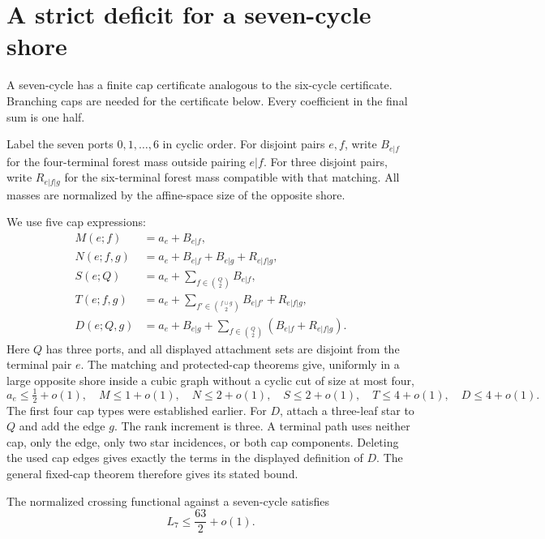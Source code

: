 \section{A strict deficit for a seven-cycle shore}
\label{sec:random-seven-cycle}

A seven-cycle has a finite cap certificate analogous to the six-cycle certificate.
Branching caps are needed for the certificate below.
Every coefficient in the final sum is one half.

Label the seven ports $0,1,\ldots,6$ in cyclic order.
For disjoint pairs $e,f$, write $B_{e|f}$ for the four-terminal forest mass outside pairing $e|f$.
For three disjoint pairs, write $R_{e|f|g}$ for the six-terminal forest mass compatible with that matching.
All masses are normalized by the affine-space size of the opposite shore.

We use five cap expressions:
\[
\begin{aligned}
 M(e;f)&=a_e+B_{e|f},\\
 N(e;f,g)&=a_e+B_{e|f}+B_{e|g}+R_{e|f|g},\\
 S(e;Q)&=a_e+\sum_{f\in\binom Q2}B_{e|f},\\
 T(e;f,g)&=a_e+\sum_{f'\in\binom{f\cup g}2}B_{e|f'}+R_{e|f|g},\\
 D(e;Q,g)&=a_e+B_{e|g}
              +\sum_{f\in\binom Q2}(B_{e|f}+R_{e|f|g}).
\end{aligned}
\]
Here $Q$ has three ports, and all displayed attachment sets are disjoint from the terminal pair $e$.
The matching and protected-cap theorems give, uniformly in a large opposite shore inside a cubic graph without a cyclic cut of size at most four,
\[
 a_e\le\tfrac12+o(1),\quad
 M\le1+o(1),\quad N\le2+o(1),\quad S\le2+o(1),
 \quad T\le4+o(1),\quad D\le4+o(1).
\]
The first four cap types were established earlier.
For $D$, attach a three-leaf star to $Q$ and add the edge $g$.
The rank increment is three.
A terminal path uses neither cap, only the edge, only two star incidences, or both cap components.
Deleting the used cap edges gives exactly the terms in the displayed definition of $D$.
The general fixed-cap theorem therefore gives its stated bound.

\begin{lemma}
\label{lem:random-seven-cycle-functional}
The normalized crossing functional against a seven-cycle satisfies
\[
 L_7\le\frac{63}{2}+o(1).
\]
\end{lemma}

